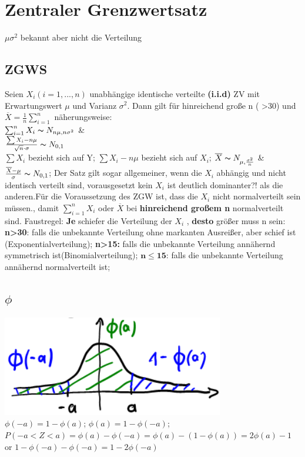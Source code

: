 \section{Zentraler Grenzwertsatz}
$\mu \sigma^2$ bekannt aber nicht die Verteilung
\subsection{ZGWS}
Seien $ X_{i} (i=1, ..., n)$ unabhängige identische verteilte \textbf{(i.i.d)} ZV mit Erwartungswert $\mu$ und Varianz
$ \sigma^2 $. Dann gilt für hinreichend große n ( >30) und $\overline{X} = \frac{1}{n} \sum_{i=1}^{n}$ näherungsweise:\\
$\sum_{i=1}^{n} X_{i}  \thicksim  N_{n\mu, n\sigma^2}$  \&\\
$\frac{\sum X_{i}-n\mu}{\sqrt{n}\cdot \sigma} \thicksim N_{0,1} $\\
$\sum X_{i} $ bezieht sich auf Y; $\sum X_{i} - n\mu$ bezieht sich auf $ X_{i}$; 
$ \overline{X} \thicksim N_{\mu, \frac{\sigma^2}{n}} $ \& $ \frac{\overline{X}-\mu}{\sigma} \thicksim N_{0,1} $; 
Der Satz gilt sogar allgemeiner, wenn die $X_{i}$ abhängig und nicht identisch verteilt sind, vorausgesetzt kein $ X_{i} $ ist deutlich dominanter?! als die anderen.Für die Voraussetzung des  ZGW ist, dass die $ X_{i} $ nicht normalverteilt sein müssen., damit $\sum_{i=1}^{n} X_{i}$ oder $\overline{X}$  bei \textbf{hinreichend großem n} normalverteilt sind. Faustregel: \textbf{Je} schiefer die Verteilung der $ X_{i}$ , \textbf{desto} größer muss n sein: 
\textbf{n>30}: falls die unbekannte Verteilung ohne markanten Ausreißer, aber schief ist (Exponentialverteilung); 
\textbf{n>15:} falls die unbekannte Verteilung annähernd symmetrisch ist(Binomialverteilung); 
$ \boldsymbol{ n \le 15 }$: falls die unbekannte Verteilung annähernd normalverteilt ist; 
\subsection{$\phi$}
\includegraphics[scale=0.25]{./pic/ZGWPhiVerteilung.png} $ \phi(-a ) = 1 - \phi(a) $; $\phi(a) = 1-\phi(-a) $; 
$ P(-a < Z < a) = \phi(a) - \phi(-a) = \phi(a) - (1-\phi(a)) = 2\phi(a) -1 $ or $ 1-\phi(-a) - \phi(-a) = 1 -2\phi(-a)$
